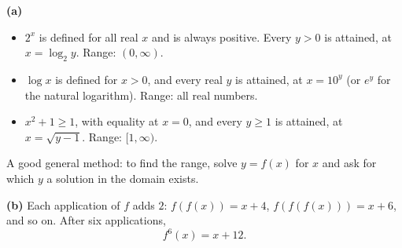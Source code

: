 \textbf{(a)}
\begin{itemize}
\item $2^x$ is defined for all real $x$ and is always positive. Every $y>0$ is attained, at $x=\log_2y$. Range: $(0,\infty)$.
\item $\log x$ is defined for $x>0$, and every real $y$ is attained, at $x=10^y$ (or $e^y$ for the natural logarithm). Range: all real numbers.
\item $x^2+1\ge1$, with equality at $x=0$, and every $y\ge1$ is attained, at $x=\sqrt{y-1}$. Range: $[1,\infty)$.
\end{itemize}
A good general method: to find the range, solve $y=f(x)$ for $x$ and ask for which $y$ a solution in the domain exists.

\textbf{(b)} Each application of $f$ adds $2$: $f(f(x))=x+4$, $f(f(f(x)))=x+6$, and so on. After six applications,
\[
f^6(x)=\boxed{x+12}.
\]
